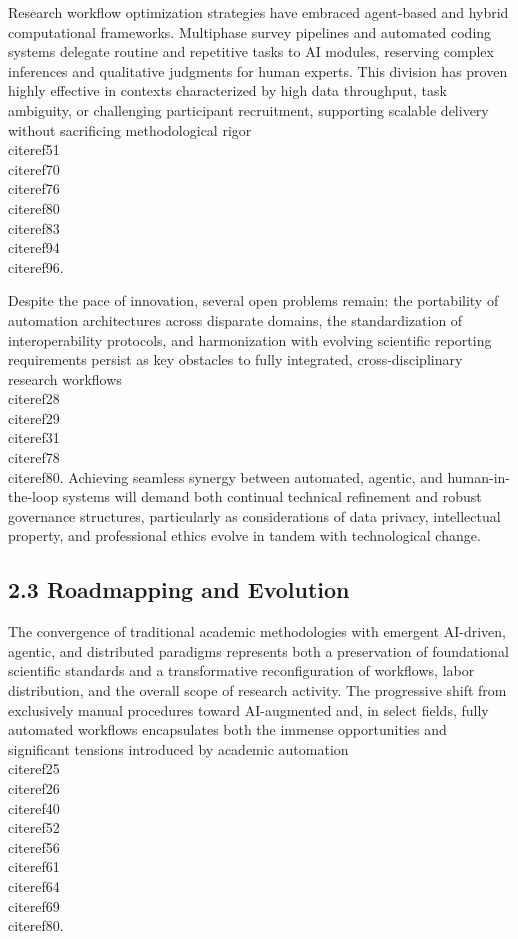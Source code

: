 \documentclass[11pt]{article}
\begin{document}
Research workflow optimization strategies have embraced agent-based and hybrid computational frameworks. Multiphase survey pipelines and automated coding systems delegate routine and repetitive tasks to AI modules, reserving complex inferences and qualitative judgments for human experts. This division has proven highly effective in contexts characterized by high data throughput, task ambiguity, or challenging participant recruitment, supporting scalable delivery without sacrificing methodological rigor \\cite{ref51}\\cite{ref70}\\cite{ref76}\\cite{ref80}\\cite{ref83}\\cite{ref94}\\cite{ref96}.

Despite the pace of innovation, several open problems remain: the portability of automation architectures across disparate domains, the standardization of interoperability protocols, and harmonization with evolving scientific reporting requirements persist as key obstacles to fully integrated, cross-disciplinary research workflows \\cite{ref28}\\cite{ref29}\\cite{ref31}\\cite{ref78}\\cite{ref80}. Achieving seamless synergy between automated, agentic, and human-in-the-loop systems will demand both continual technical refinement and robust governance structures, particularly as considerations of data privacy, intellectual property, and professional ethics evolve in tandem with technological change.

\subsection{2.3 Roadmapping and Evolution}

The convergence of traditional academic methodologies with emergent AI-driven, agentic, and distributed paradigms represents both a preservation of foundational scientific standards and a transformative reconfiguration of workflows, labor distribution, and the overall scope of research activity. The progressive shift from exclusively manual procedures toward AI-augmented and, in select fields, fully automated workflows encapsulates both the immense opportunities and significant tensions introduced by academic automation \\cite{ref25}\\cite{ref26}\\cite{ref40}\\cite{ref52}\\cite{ref56}\\cite{ref61}\\cite{ref64}\\cite{ref69}\\cite{ref80}.
\end{document}
